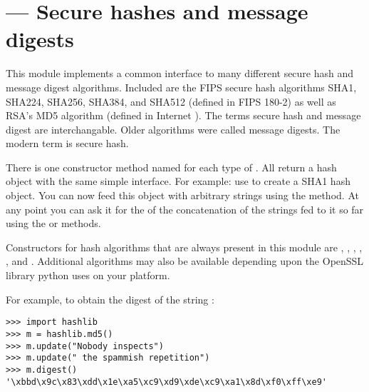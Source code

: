 \section{ ---
         Secure hashes and message digests}




This module implements a common interface to many different secure hash and
message digest algorithms.  Included are the FIPS secure hash algorithms SHA1,
SHA224, SHA256, SHA384, and SHA512 (defined in FIPS 180-2) as well as RSA's MD5
algorithm (defined in Internet ).
The terms secure hash and message digest are interchangable.  Older
algorithms were called message digests.  The modern term is secure hash.


There is one constructor method named for each type of .  All return
a hash object with the same simple interface.
For example: use  to create a SHA1 hash object.
You can now feed this object with arbitrary strings using the 
method.  At any point you can ask it for the  of the concatenation
of the strings fed to it so far using the  or
 methods.

Constructors for hash algorithms that are always present in this module are
, , , ,
, and .  Additional algorithms may also
be available depending upon the OpenSSL library python uses on your platform.

For example, to obtain the digest of the string :

\begin{verbatim}
>>> import hashlib
>>> m = hashlib.md5()
>>> m.update("Nobody inspects")
>>> m.update(" the spammish repetition")
>>> m.digest()
'\xbbd\x9c\x83\xdd\x1e\xa5\xc9\xd9\xde\xc9\xa1\x8d\xf0\xff\xe9'
\end{verbatim}

